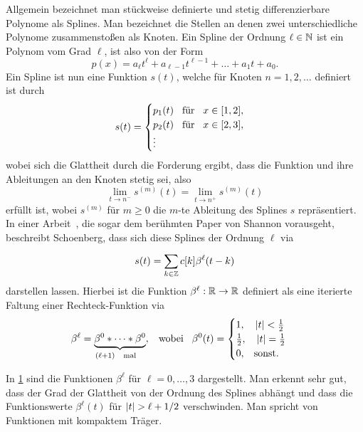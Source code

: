 Allgemein bezeichnet man st\"uckweise definierte und stetig differenzierbare Polynome als Splines. Man bezeichnet die Stellen an denen zwei unterschiedliche Polynome zusammensto{\ss}en als Knoten. Ein Spline der Ordnung $\ell \in \mathbb{N}$ ist ein Polynom vom Grad $\ell$, ist also von der Form
\begin{equation}
    p(x) = 
        a_{\ell} t^{\ell} 
        + a_{\ell - 1} t^{\ell-1} 
        + \dots
        + a_1 t 
        + a_{0}.
\end{equation}
%
Ein Spline ist nun eine Funktion $s(t)$, welche f\"ur Knoten $n = 1, 2, \dots$ definiert ist durch
\begin{equation}
    s(t) = \begin{cases}
        p_1(t) {\hspace{3mm} \text{f\"ur} \hspace{3mm}} x \in [1,2], \\
        p_2(t) {\hspace{3mm} \text{f\"ur} \hspace{3mm}} x \in [2,3], \\
        \vdots
    \end{cases}
\end{equation}
wobei sich die Glattheit durch die Forderung ergibt, dass die Funktion und ihre Ableitungen an den Knoten stetig sei, also
\begin{equation}
    \lim\limits_{t \rightarrow n^-} s^{(m)}(t) =
    \lim\limits_{t \rightarrow n^+} s^{(m)}(t)
\end{equation}
erf\"ullt ist, wobei $s^{(m)}$ f\"ur $m \geqslant 0$ die $m$-te Ableitung des Splines $s$ repr\"asentiert. In einer Arbeit~\cite{schoenberg1988bsplines}, die sogar dem ber\"uhmten Paper von Shannon vorausgeht, beschreibt Schoenberg, dass sich diese Splines der Ordnung $\ell$ via
\begin{equation}\label{bsplines_summation}
    s(t) = {\sum\limits_{k \in \mathbb{Z}}^{}{
        c[k] \beta^{\ell}(t - k)
    }}
\end{equation}
darstellen lassen. Hierbei ist die Funktion $\beta^\ell: \mathbb{R} \rightarrow \mathbb{R}$ definiert als eine iterierte Faltung einer Rechteck-Funktion via
\begin{equation}
    \beta^\ell = \underbrace{
        \beta^0 \ast \dots \ast \beta^0
    }_{(\ell+1) {\hspace{3mm} \text{mal} \hspace{3mm}}}, 
    {\hspace{3mm} \text{wobei} \hspace{3mm}}
    \beta^0(t) = \begin{cases}
        1,\quad {\left| t \right|} < \frac{1}{2} \\
        \frac{1}{2}, \quad {\left| t \right|} = \frac{1}{2} \\
        0, {\hspace{3mm} \text{sonst.} \hspace{3mm}}
    \end{cases}
\end{equation}
%
\begin{figure}
    \caption{}\label{bsplines_order3}
\end{figure}
%
In \cref{bsplines_order3} sind die Funktionen $\beta^\ell$ f\"ur $\ell = 0, \dots, 3$ dargestellt. Man erkennt sehr gut, dass der Grad der Glattheit von der Ordnung des Splines abh\"angt und dass die Funktionswerte $\beta^\ell(t)$ f\"ur ${\left| t \right|}>\ell+1/2$ verschwinden. Man spricht von Funktionen mit kompaktem Tr\"ager.

